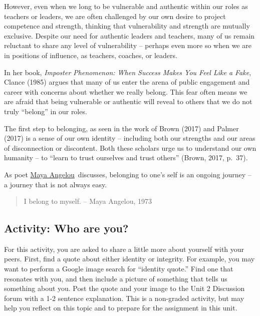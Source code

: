\documentclass[
]{book}
\begin{document}
However, even when we long to be vulnerable and authentic within our roles as teachers or leaders, we are often challenged by our own desire to project competence and strength, thinking that vulnerability and strength are mutually exclusive. Despite our need for authentic leaders and teachers, many of us remain reluctant to share any level of vulnerability -- perhaps even more so when we are in positions of influence, as teachers, coaches, or leaders.

In her book, \emph{Imposter Phenomenon: When Success Makes You Feel Like a Fake}, Clance (1985) argues that many of us enter the arena of public engagement and career with concerns about whether we really belong. This fear often means we are afraid that being vulnerable or authentic will reveal to others that we do not truly ``belong'' in our roles.

The first step to belonging, as seen in the work of Brown (2017) and Palmer (2017) is a sense of our own identity -- including both our strengths and our areas of disconnection or discontent. Both these scholars urge us to understand our own humanity -- to ``learn to trust ourselves and trust others'' (Brown, 2017, p.~37).

As poet \href{http://billmoyers.com/content/conversation-maya-angelou/}{Maya Angelou}~discusses, belonging to one's self is an ongoing journey -- a journey that is not always easy.

\begin{quote}
I belong to myself. -- Maya Angelou, 1973
\end{quote}

\hypertarget{activity-who-are-you}{%
\subsection*{Activity: Who are you?}\label{activity-who-are-you}}

\begin{reflect}
For this activity, you are asked to share a little more about yourself
with your peers. First, find a quote about either identity or integrity.
For example, you may want to perform a Google image search for
``identity quote.'' Find one that resonates with you, and then include a
picture of something that tells us something about you. Post the quote
and your image to the Unit 2 Discussion forum with a 1-2 sentence
explanation. This is a non-graded activity, but may help you reflect on
this topic and to prepare for the assignment in this unit.
\end{reflect}
\end{document}
